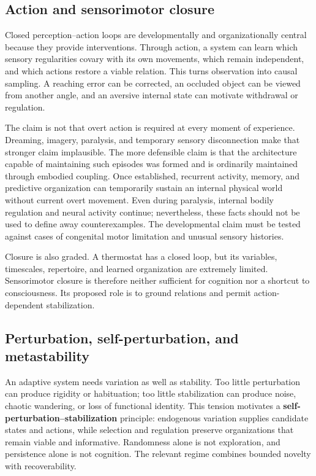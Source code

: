 \documentclass[
  11pt,
  a4paper,
]{article}
\begin{document}
\subsection{Action and sensorimotor
closure}\label{action-and-sensorimotor-closure}

Closed perception--action loops are developmentally and organizationally
central because they provide interventions. Through action, a system can
learn which sensory regularities covary with its own movements, which
remain independent, and which actions restore a viable relation. This
turns observation into causal sampling. A reaching error can be
corrected, an occluded object can be viewed from another angle, and an
aversive internal state can motivate withdrawal or regulation.

The claim is not that overt action is required at every moment of
experience. Dreaming, imagery, paralysis, and temporary sensory
disconnection make that stronger claim implausible. The more defensible
claim is that the architecture capable of maintaining such episodes was
formed and is ordinarily maintained through embodied coupling. Once
established, recurrent activity, memory, and predictive organization can
temporarily sustain an internal physical world without current overt
movement. Even during paralysis, internal bodily regulation and neural
activity continue; nevertheless, these facts should not be used to
define away counterexamples. The developmental claim must be tested
against cases of congenital motor limitation and unusual sensory
histories.

Closure is also graded. A thermostat has a closed loop, but its
variables, timescales, repertoire, and learned organization are
extremely limited. Sensorimotor closure is therefore neither sufficient
for cognition nor a shortcut to consciousness. Its proposed role is to
ground relations and permit action-dependent stabilization.

\subsection{Perturbation, self-perturbation, and
metastability}\label{perturbation-self-perturbation-and-metastability}

An adaptive system needs variation as well as stability. Too little
perturbation can produce rigidity or habituation; too little
stabilization can produce noise, chaotic wandering, or loss of
functional identity. This tension motivates a
\textbf{self-perturbation--stabilization} principle: endogenous
variation supplies candidate states and actions, while selection and
regulation preserve organizations that remain viable and informative.
Randomness alone is not exploration, and persistence alone is not
cognition. The relevant regime combines bounded novelty with
recoverability.
\end{document}
